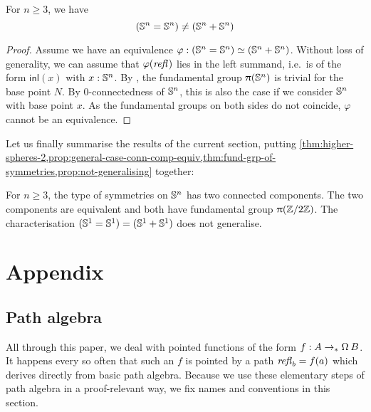\documentclass[english,a4]{article}
\newcommand{\ptdto}{\to_\ast}%
\begin{document}
\begin{proposition}\label{prop:not-generalising}
    For $n \geq 3$, we have
    \begin{equation}
    ({\mathbb S^{n}} = {\mathbb S^{n}}) \not= ({\mathbb S^{n}} + {\mathbb S^{n}})
    \end{equation}
\end{proposition}
\begin{proof}
    Assume we have an equivalence $\varphi : ({\mathbb S^{n}} = {\mathbb S^{n}}) \simeq ({\mathbb S^{n}} + {\mathbb S^{n}})$.
    Without loss of generality, we can assume that $\varphi(\mathop{{\mathit{refl}}_{}})$ lies in the left summand, 
    i.e.\ is of the form $\mathsf{inl}(x)$ with $x : {\mathbb S^{n}}$. 
    By \cite{HoTT}, the fundamental group $\uppi({\mathbb S^{n}})$ is trivial for the base point $N$. By $0$-connectedness of ${\mathbb S^{n}}$, this is also the case if we consider ${\mathbb S^{n}}$ with base point $x$.
    As the fundamental groups on both sides do not coincide, $\varphi$ cannot be an equivalence.
\end{proof}

Let us finally summarise the results of the current section, putting \cref{thm:higher-spheres-2,prop:general-case-conn-comp-equiv,thm:fund-grp-of-symmetries,prop:not-generalising} together:

\begin{theorem}
    For $n \geq 3$, the type of symmetries on ${\mathbb S^{n}}$ has two connected components. The two components are equivalent and both have fundamental group $\uppi(\mathbb{Z} \slash 2\mathbb{Z})$.
    The characterisation $({\mathbb S^{1}} = {\mathbb S^{1}}) = ({\mathbb S^{1}} + {\mathbb S^{1}})$ does not generalise.
\end{theorem}

\section{Appendix}
\label{sec:appendix}



\subsection{Path algebra}
\label{sec:path-algebra}
All through this paper, we deal with pointed functions of the form $f:A \ptdto
\loopspace\null B$. It happens every so often that such an $f$ is pointed by a
path $\mathop{{\mathit{refl}}_{b}} = f(a)$ which derives directly from basic path algebra. Because
we use these elementary steps of path algebra in a proof-relevant way, 
we fix names and conventions in this section.
\end{document}
